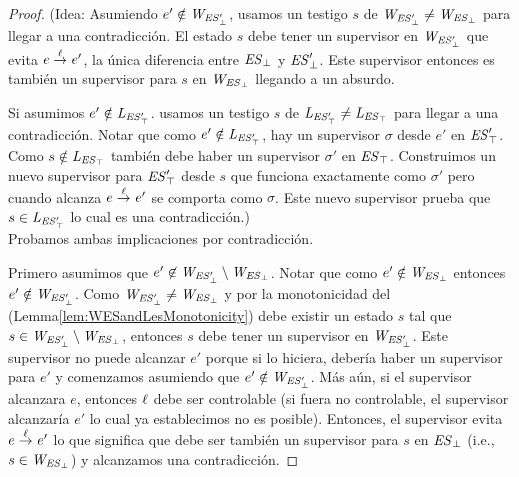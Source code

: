 \begin{proof}
	(Idea: Asumiendo $e' \notin \mathit{W_{\mathit{\mathit{ES}'_{\bot}}}}$, usamos un testigo $s$ de $\mathit{W_{\mathit{\mathit{ES}'_{\bot}}}} \neq 
	\mathit{W_{\mathit{\mathit{ES}_{\bot}}}}$ para llegar a una contradicción. El estado $s$ debe tener un supervisor en 
	$\mathit{W_{\mathit{\mathit{ES}'_{\bot}}}}$ que evita $e \overset{\ell}{\rightarrow}_{} e'$, la única diferencia entre $\mathit{\mathit{ES}_{\bot}}$ y $\mathit{\mathit{ES}'_{\bot}}$. Este supervisor entonces es también un supervisor para $s$ en $\mathit{W_{\mathit{\mathit{ES}_{\bot}}}}$ llegando a un absurdo. 
	
	Si asumimos $e' \notin \mathit{L_{\mathit{\mathit{ES}'_{\top}}}}$.  usamos un testigo $s$ de $\mathit{L_{\mathit{\mathit{ES}'_{\top}}}} \neq \mathit{L_{\mathit{\mathit{ES}_{\top}}}}$ para llegar a una contradicción. Notar que como $e' \notin \mathit{L_{\mathit{\mathit{ES}'_{\top}}}}$, hay un supervisor $\sigma$ desde $e'$ en  
	$\mathit{\mathit{ES}'_{\top}}$. Como $s \notin \mathit{L_{\mathit{\mathit{ES}_{\top}}}}$ también debe haber un supervisor $\sigma'$ en $\mathit{\mathit{ES}_{\top}}$. Construimos un nuevo supervisor para $\mathit{\mathit{ES}'_{\top}}$ desde $s$ que funciona exactamente como $\sigma'$ pero cuando alcanza $e \overset{\ell}{\rightarrow}_{} e'$ se comporta como $\sigma$. Este nuevo supervisor prueba que $s \in \mathit{L_{\mathit{\mathit{ES}'_{\top}}}}$ lo cual es una contradicción.)\\


Probamos ambas implicaciones por contradicción. 

Primero asumimos que $e' \not \in 
\mathit{W_{\mathit{\mathit{ES}'_{\bot}}}} \setminus \mathit{W_{\mathit{\mathit{ES}_{\bot}}}}$. Notar que como $e' \notin \mathit{W_{\mathit{\mathit{ES}_{\bot}}}}$ entonces $e' \notin \mathit{W_{\mathit{\mathit{ES}'_{\bot}}}}$. Como $\mathit{W_{\mathit{\mathit{ES}'_{\bot}}}} \neq \mathit{W_{\mathit{\mathit{ES}_{\bot}}}}$ y por la monotonicidad del (Lemma\ref{lem:WESandLesMonotonicity}) debe existir un estado $s$ tal que $s \in \mathit{W_{\mathit{\mathit{ES}'_{\bot}}}} \setminus 
\mathit{W_{\mathit{\mathit{ES}_{\bot}}}}$, entonces $s$ debe tener un supervisor en $\mathit{W_{\mathit{\mathit{ES}'_{\bot}}}} $. Este supervisor no puede alcanzar $e'$ porque si lo hiciera, debería haber un supervisor para $e'$ y comenzamos asumiendo que $e' 
\notin \mathit{W_{\mathit{\mathit{ES}'_{\bot}}}}$. Más aún, si el supervisor alcanzara $e$, entonces $\ell$ debe ser controlable (si fuera no controlable, el supervisor alcanzaría $e'$ lo cual ya establecimos no es posible). Entonces, el supervisor evita $e \overset{\ell}{\rightarrow}_{} e'$ lo que significa que debe ser también un supervisor para $s$ en $\mathit{\mathit{ES}_{\bot}}$ (i.e.,  $s \in \mathit{W_{\mathit{\mathit{ES}_{\bot}}}}$) y alcanzamos una contradicción.


\end{proof}
